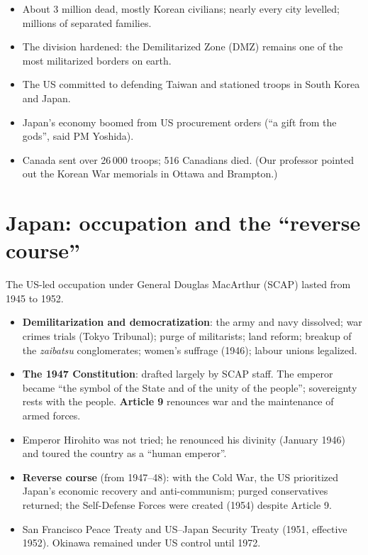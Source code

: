 \begin{important}[Consequences]
\begin{itemize}
  \item About 3 million dead, mostly Korean civilians; nearly every city levelled; millions
        of separated families.
  \item The division hardened: the Demilitarized Zone (DMZ) remains one of the most
        militarized borders on earth.
  \item The US committed to defending Taiwan and stationed troops in South Korea and Japan.
  \item Japan's economy boomed from US procurement orders (``a gift from the gods'',
        said PM Yoshida).
  \item Canada sent over 26\,000 troops; 516 Canadians died. (Our professor pointed out the
        Korean War memorials in Ottawa and Brampton.)
\end{itemize}
\end{important}

\section{Japan: occupation and the ``reverse course''}

The US-led occupation under General Douglas MacArthur (SCAP) lasted from 1945 to 1952.

\begin{itemize}
  \item \textbf{Demilitarization and democratization}: the army and navy dissolved; war
        crimes trials (Tokyo Tribunal); purge of militarists; land reform; breakup of the
        \emph{zaibatsu} conglomerates; women's suffrage (1946); labour unions legalized.
  \item \textbf{The 1947 Constitution}: drafted largely by SCAP staff. The emperor became
        ``the symbol of the State and of the unity of the people''; sovereignty rests with
        the people. \textbf{Article 9} renounces war and the maintenance of armed forces.
  \item Emperor Hirohito was not tried; he renounced his divinity (January 1946) and
        toured the country as a ``human emperor''.
  \item \textbf{Reverse course} (from 1947--48): with the Cold War, the US prioritized
        Japan's economic recovery and anti-communism; purged conservatives returned; the
        Self-Defense Forces were created (1954) despite Article 9.
  \item San Francisco Peace Treaty and US--Japan Security Treaty (1951, effective 1952).
        Okinawa remained under US control until 1972.
\end{itemize}


